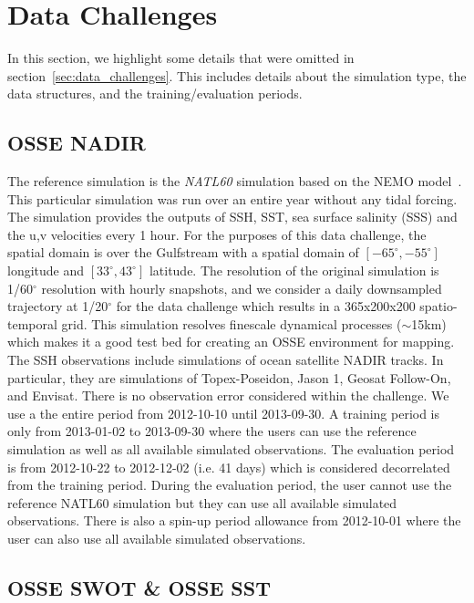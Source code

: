 \section{Data Challenges} \label{sec:data_challenges_extended}

In this section, we highlight some details that were omitted in section~\ref{sec:data_challenges}.
This includes details about the simulation type, the data structures, and the training/evaluation periods.

\subsection{OSSE NADIR} \label{sec:osse_nadir}

The reference simulation is the \textit{NATL60} simulation based on the NEMO model~\cite{NEMOAJAYI2020}. 
This particular simulation was run over an entire year without any tidal forcing.
The simulation provides the outputs of SSH, SST, sea surface salinity (SSS) and the u,v velocities every 1 hour.
For the purposes of this data challenge, the spatial domain is over the Gulfstream with a spatial domain of $[-65^\circ, -55^\circ]$ longitude and $[33^\circ, 43^\circ]$ latitude.
The resolution of the original simulation is 1/60$^\circ$ resolution with hourly snapshots, and we consider a daily downsampled trajectory at 1/20$^\circ$ for the data challenge which results in a 365x200x200 spatio-temporal grid.
This simulation resolves finescale dynamical processes ($\sim$15km) which makes it a good test bed for creating an OSSE environment for mapping.
The SSH observations include simulations of ocean satellite NADIR tracks.
In particular, they are simulations of Topex-Poseidon, Jason 1, Geosat Follow-On, and Envisat.
There is no observation error considered within the challenge.
We use a the entire period from 2012-10-10 until 2013-09-30.
A training period is only from 2013-01-02 to 2013-09-30 where the users can use the reference simulation as well as all available simulated observations.
The evaluation period is from 2012-10-22 to 2012-12-02 (i.e. 41 days) which is considered decorrelated from the training period. 
During the evaluation period, the user cannot use the reference NATL60 simulation but they can use all available simulated observations. There is also a spin-up period allowance from 2012-10-01 where the user can also use all available simulated observations.

\subsection{OSSE SWOT \& OSSE SST} \label{sec:osse_swot_sst}

